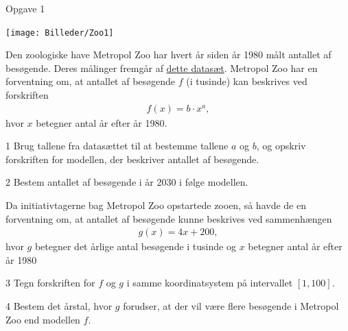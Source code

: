 
\begin{opgavetekst}{Opgave 1}
	\begin{center}
		\texttt{[image: Billeder/Zoo1]}
	\end{center}
	Den zoologiske have Metropol Zoo har hvert år siden år 1980 målt antallet af besøgende. Deres målinger 
	fremgår af \href{https://github.com/ChristianJLex/TeachingNotes/raw/master/2023-2024/Data og lign/BesoegendeiZoo.xlsx}{\color{blue!60} dette datasæt}.
	Metropol Zoo har en forventning om, at antallet af besøgende $f$ (i tusinde) kan
	beskrives ved forskriften
	\begin{align*}
		f(x) = b\cdot x^a,
	\end{align*}
	hvor $x$ betegner antal år efter år 1980.
\end{opgavetekst}


\begin{delopgave}{}{1}
	Brug tallene fra datasættet til at bestemme tallene $a$ og $b$, og opskriv forskriften for 
	modellen, der beskriver antallet af besøgende.
\end{delopgave}
\begin{delopgave}{}{2}
	Bestem antallet af besøgende i år 2030 i følge modellen. 
\end{delopgave}
\begin{meretekst}
	Da initiativtagerne bag Metropol Zoo opstartede zooen, så havde de en forventning
	om, at antallet af besøgende kunne beskrives ved sammenhængen
	\begin{align*}
		g(x) = 4x + 200,
	\end{align*}
	hvor $g$ betegner det årlige antal besøgende i tusinde og $x$ betegner antal år efter år 
	1980
\end{meretekst}
\begin{delopgave}{}{3}
	Tegn forskriften for $f$ og $g$ i samme koordinatsystem på intervallet $[1,100]$. 
\end{delopgave}
\begin{delopgave}{}{4}
	Bestem det årstal, hvor $g$ forudser, at der vil være flere besøgende i Metropol Zoo end
	modellen $f$.
\end{delopgave}

